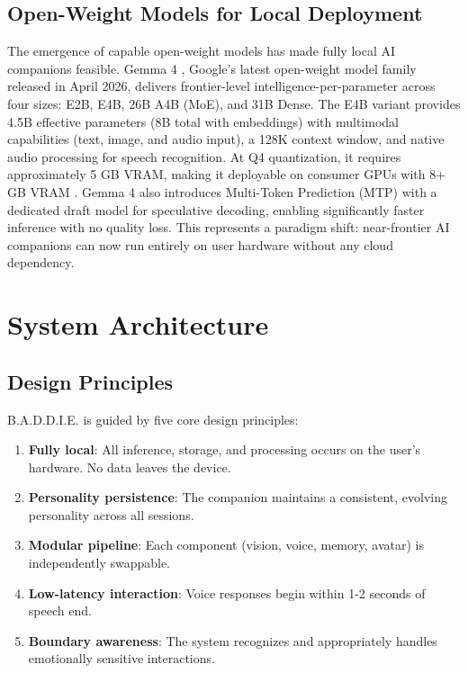 \documentclass[sigconf]{acmart}
\begin{document}
\subsection{Open-Weight Models for Local Deployment}

The emergence of capable open-weight models has made fully local AI companions feasible. Gemma 4 \cite{gemma4modelcard, gemma4blog}, Google's latest open-weight model family released in April 2026, delivers frontier-level intelligence-per-parameter across four sizes: E2B, E4B, 26B A4B (MoE), and 31B Dense. The E4B variant provides 4.5B effective parameters (8B total with embeddings) with multimodal capabilities (text, image, and audio input), a 128K context window, and native audio processing for speech recognition. At Q4 quantization, it requires approximately 5 GB VRAM, making it deployable on consumer GPUs with 8+ GB VRAM \cite{gemma4modelcard}. Gemma 4 also introduces Multi-Token Prediction (MTP) with a dedicated draft model for speculative decoding, enabling significantly faster inference with no quality loss. This represents a paradigm shift: near-frontier AI companions can now run entirely on user hardware without any cloud dependency.

\section{System Architecture}

\subsection{Design Principles}

B.A.D.D.I.E. is guided by five core design principles:

\begin{enumerate}
    \item \textbf{Fully local}: All inference, storage, and processing occurs on the user's hardware. No data leaves the device.
    \item \textbf{Personality persistence}: The companion maintains a consistent, evolving personality across all sessions.
    \item \textbf{Modular pipeline}: Each component (vision, voice, memory, avatar) is independently swappable.
    \item \textbf{Low-latency interaction}: Voice responses begin within 1-2 seconds of speech end.
    \item \textbf{Boundary awareness}: The system recognizes and appropriately handles emotionally sensitive interactions.
\end{enumerate}
\end{document}
